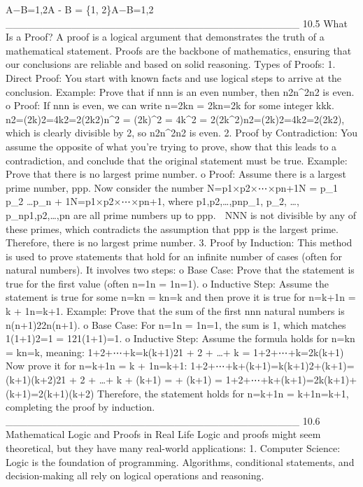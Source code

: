 A−B={1,2}A - B = \{1, 2\}A−B={1,2}
________________________________________
10.5 What Is a Proof?
A proof is a logical argument that demonstrates the truth of a mathematical statement. Proofs are the backbone of mathematics, ensuring that our conclusions are reliable and based on solid reasoning.
Types of Proofs:
1.	Direct Proof: You start with known facts and use logical steps to arrive at the conclusion.
Example: Prove that if nnn is an even number, then n2n^2n2 is even.
o	Proof: If nnn is even, we can write n=2kn = 2kn=2k for some integer kkk.
	n2=(2k)2=4k2=2(2k2)n^2 = (2k)^2 = 4k^2 = 2(2k^2)n2=(2k)2=4k2=2(2k2), which is clearly divisible by 2, so n2n^2n2 is even.
2.	Proof by Contradiction: You assume the opposite of what you're trying to prove, show that this leads to a contradiction, and conclude that the original statement must be true.
Example: Prove that there is no largest prime number.
o	Proof: Assume there is a largest prime number, ppp. Now consider the number N=p1×p2×⋯×pn+1N = p_1 \times p_2 \times \dots \times p_n + 1N=p1×p2×⋯×pn+1, where p1,p2,…,pnp_1, p_2, \dots, p_np1,p2,…,pn are all prime numbers up to ppp.
	NNN is not divisible by any of these primes, which contradicts the assumption that ppp is the largest prime. Therefore, there is no largest prime number.
3.	Proof by Induction: This method is used to prove statements that hold for an infinite number of cases (often for natural numbers). It involves two steps:
o	Base Case: Prove that the statement is true for the first value (often n=1n = 1n=1).
o	Inductive Step: Assume the statement is true for some n=kn = kn=k and then prove it is true for n=k+1n = k + 1n=k+1.
Example: Prove that the sum of the first nnn natural numbers is n(n+1)22n(n+1).
o	Base Case: For n=1n = 1n=1, the sum is 1, which matches 1(1+1)2=1 = 121(1+1)=1.
o	Inductive Step: Assume the formula holds for n=kn = kn=k, meaning: 1+2+⋯+k=k(k+1)21 + 2 + \dots + k = 1+2+⋯+k=2k(k+1) Now prove it for n=k+1n = k + 1n=k+1: 1+2+⋯+k+(k+1)=k(k+1)2+(k+1)=(k+1)(k+2)21 + 2 + \dots + k + (k+1) =  + (k+1) = 1+2+⋯+k+(k+1)=2k(k+1)+(k+1)=2(k+1)(k+2) Therefore, the statement holds for n=k+1n = k+1n=k+1, completing the proof by induction.
________________________________________
10.6 Mathematical Logic and Proofs in Real Life
Logic and proofs might seem theoretical, but they have many real-world applications:
1.	Computer Science: Logic is the foundation of programming. Algorithms, conditional statements, and decision-making all rely on logical operations and reasoning.
